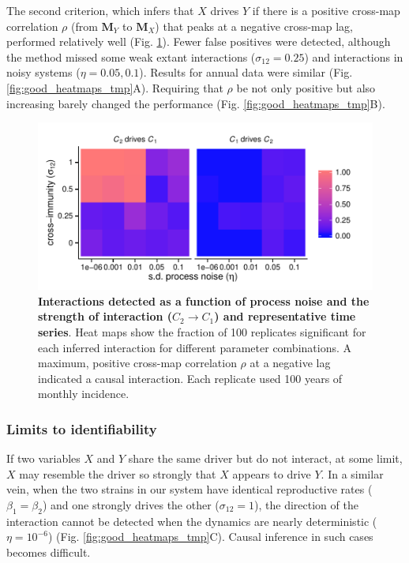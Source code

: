 \documentclass[10pt]{article}
\begin{document}
The second criterion, which infers that $X$ drives $Y$ if there is a positive cross-map correlation $\rho$ (from $\textbf{M}_Y$ to $\textbf{M}_X$) that peaks at a negative cross-map lag, performed relatively well (Fig. \ref{fig:univar_monthly_lag_seas_diff_tmp}).
Fewer false positives were detected, although the method missed some weak extant interactions ($\sigma_{12}=0.25$) and interactions in noisy systems ($\eta=0.05, 0.1$).
Results for annual data were similar (Fig. \ref{fig:good_heatmaps_tmp}A).
Requiring that $\rho$ be not only positive but also increasing barely changed the performance (Fig. \ref{fig:good_heatmaps_tmp}B). 

\begin{figure}
\begin{center}
  \includegraphics[width=5in]{dataflow/out/fig_detect_lag/fig_detect_lag.pdf}
  \end{center}
  \caption{\textbf{Interactions detected as a function of process noise and the strength of interaction ($C_2 \rightarrow C_1$) and representative time series}. Heat maps show the fraction of 100 replicates significant for each inferred interaction for different parameter combinations. A maximum, positive cross-map correlation $\rho$ at a negative lag indicated a causal interaction. Each replicate used 100 years of monthly incidence. \label{fig:univar_monthly_lag_seas_diff_tmp}} 
\end{figure}

\subsubsection{Limits to identifiability}

If two variables $X$ and $Y$ share the same driver but do not interact, at some limit, $X$ may resemble the driver so strongly that $X$ appears to drive $Y$.
In a similar vein, when the two strains in our system have identical reproductive rates ($\beta_1= \beta_2$) and one strongly drives the other ($\sigma_{12}=1$), the direction of the interaction cannot be detected when the dynamics are nearly deterministic ($\eta=10^{-6}$) (Fig. \ref{fig:good_heatmaps_tmp}C). 
Causal inference in such cases becomes difficult.
\end{document}
